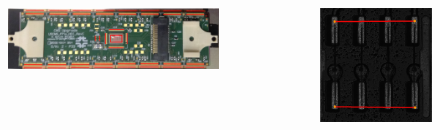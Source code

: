 \documentclass{beamer}
\begin{document}
\begin{frame}
    \begin{columns}
        \begin{column}{0.25\textwidth}
            \begin{figure}
                \includegraphics[angle=90, height=0.95\textheight]{"figures/Module"}
            \end{figure}
        \end{column}
        \begin{column}{0.75\textwidth}
            \begin{figure}
                \includegraphics[width=\textwidth]{"figures/review_address_HV_pads"}
            \end{figure}
        \end{column}
    \end{columns}
\end{frame}
\end{document}
